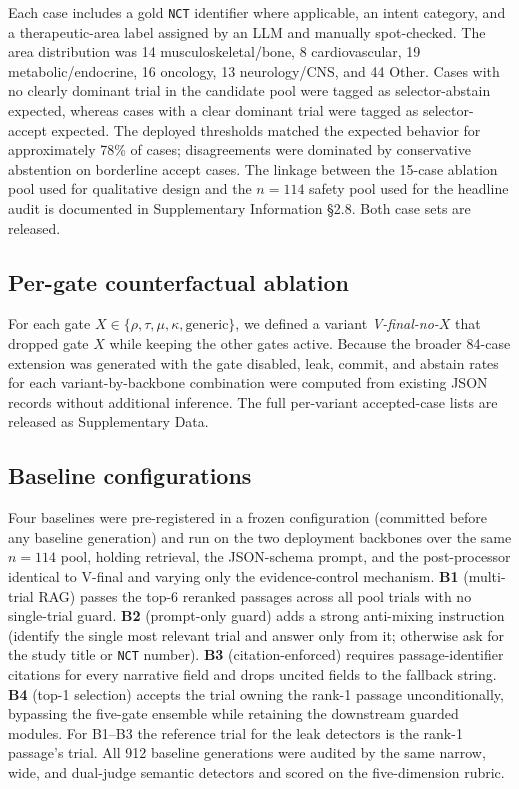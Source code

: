 \documentclass[pdflatex,Numbered]{sn-jnl}
\theoremstyle{plain}
\begin{document}
Each case includes a gold \texttt{NCT} identifier where applicable, an intent category, and a therapeutic-area label assigned by an LLM and manually spot-checked. The area distribution was 14 musculoskeletal/bone, 8 cardiovascular, 19 metabolic/endocrine, 16 oncology, 13 neurology/CNS, and 44 Other. Cases with no clearly dominant trial in the candidate pool were tagged as selector-abstain expected, whereas cases with a clear dominant trial were tagged as selector-accept expected. The deployed thresholds matched the expected behavior for approximately 78\% of cases; disagreements were dominated by conservative abstention on borderline accept cases. The linkage between the 15-case ablation pool used for qualitative design and the $n=114$ safety pool used for the headline audit is documented in Supplementary Information \S2.8. Both case sets are released.

\subsection{Per-gate counterfactual ablation}
\label{sec:methods_pergate}

For each gate $X \in \{\rho, \tau, \mu, \kappa, \mathrm{generic}\}$, we defined a variant \emph{V-final-no-}$X$ that dropped gate $X$ while keeping the other gates active. Because the broader 84-case extension was generated with the gate disabled, leak, commit, and abstain rates for each variant-by-backbone combination were computed from existing JSON records without additional inference. The full per-variant accepted-case lists are released as Supplementary Data.

\subsection{Baseline configurations}
\label{sec:methods_baselines}

Four baselines were pre-registered in a frozen configuration (committed before any baseline generation) and run on the two deployment backbones over the same $n=114$ pool, holding retrieval, the JSON-schema prompt, and the post-processor identical to V-final and varying only the evidence-control mechanism. \textbf{B1} (multi-trial RAG) passes the top-6 reranked passages across all pool trials with no single-trial guard. \textbf{B2} (prompt-only guard) adds a strong anti-mixing instruction (identify the single most relevant trial and answer only from it; otherwise ask for the study title or \texttt{NCT} number). \textbf{B3} (citation-enforced) requires passage-identifier citations for every narrative field and drops uncited fields to the fallback string. \textbf{B4} (top-1 selection) accepts the trial owning the rank-1 passage unconditionally, bypassing the five-gate ensemble while retaining the downstream guarded modules. For B1--B3 the reference trial for the leak detectors is the rank-1 passage's trial. All 912 baseline generations were audited by the same narrow, wide, and dual-judge semantic detectors and scored on the five-dimension rubric.
\end{document}

